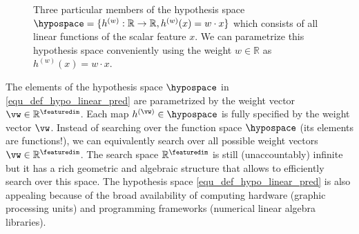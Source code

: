 \documentclass[12pt]{report}
\begin{document}
\begin{figure}[htbp]
\begin{center}
     \vspace*{-4mm}
\end{center}
\caption{Three particular members of the hypothesis space 
	$\hypospace =\{ h^{(w)}: \mathbb{R} \rightarrow \mathbb{R}, h^{(w)}(x) = w \cdot x \}$ 
which consists of all linear functions of the scalar feature $x$. We can parametrize 
this hypothesis space conveniently using the weight $w\in \mathbb{R}$ as $h^{(w)}(x) = w \cdot x$.}
\label{scalar_lin_space}
\end{figure}

The elements of the hypothesis space $\hypospace$ in \eqref{equ_def_hypo_linear_pred} are  
parametrized by the weight vector $\vw \in \mathbb{R}^{\featuredim}$. 
Each map $h^{(\vw)} \in \hypospace$ is fully specified by the weight 
vector $\vw$. Instead of searching over the function space $\hypospace$ 
(its elements are functions!), we can equivalently search over all 
possible weight vectors $\vw \in \mathbb{R}^{\featuredim}$. 
The search space $\mathbb{R}^{\featuredim}$ is still (unaccountably) 
infinite but it has a rich geometric and algebraic structure that 
allows to efficiently search over this space. The hypothesis 
space \eqref{equ_def_hypo_linear_pred} is also appealing because 
of the broad availability of computing hardware (graphic processing units) 
and programming frameworks (numerical linear algebra libraries). 
\end{document}
